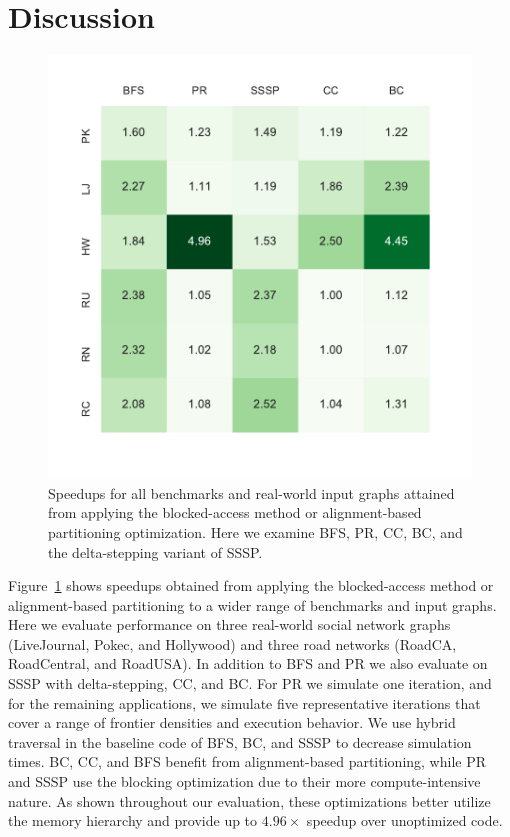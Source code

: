 \section{Discussion}\label{sec:discussion}


\begin{figure}[t!]
    \centering
    \includegraphics[scale=0.6]{graphit-figures/heatmap.pdf}
    \caption{Speedups for all benchmarks and real-world input graphs attained from applying the blocked-access method or alignment-based partitioning optimization. Here we examine BFS, PR, CC, BC, and the delta-stepping variant of SSSP.}
    \label{pap:generals:sec:eval:fig:heatmap}
\end{figure}

Figure~\ref{pap:generals:sec:eval:fig:heatmap} shows speedups obtained from applying the blocked-access method or alignment-based partitioning to a wider range of benchmarks and input graphs.
Here we evaluate performance on three real-world social network graphs (LiveJournal, Pokec, and Hollywood) and three road networks (RoadCA, RoadCentral, and RoadUSA).
In addition to BFS and PR we also evaluate on SSSP with delta-stepping, CC, and BC.
For PR we simulate one iteration, and for the remaining applications, we simulate five representative iterations that cover a range of frontier densities and execution behavior.
We use hybrid traversal in the baseline code of BFS, BC, and SSSP to decrease simulation times.
BC, CC, and BFS benefit from alignment-based partitioning, while PR and SSSP use the blocking optimization due to their more compute-intensive nature.
As shown throughout our evaluation, these optimizations better utilize the memory hierarchy and provide up to $4.96\times$ speedup over unoptimized code.

